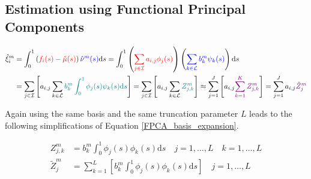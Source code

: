 \documentclass[11pt,twoside,a4paper]{article}
\begin{document}
	\subsection{Estimation using Functional Principal Components}
	
	
	\begin{equation}\label{FPCA_basis_expansion}
		\begin{split}
			\hat{\xi}_{i}^m & = \int_{0}^{1} \left({\color{red} f_i(s) - \hat{\mu}(s)}\right) {\color{blue}\hat{\nu}^m(s)} \mathrm{d}s
			= \int_{0}^{1} \left({\color{red}\sum_{j \in \mathcal{I}} a_{i,j} \phi_j(s)}\right) \left({\color{blue}\sum_{k \in \mathcal{L}} b_{k}^m \psi_{k}(s)}\right) \mathrm{d}s \\
			& = \sum_{j \in \mathcal{I}} \left[ a_{i,j}\sum_{k \in \mathcal{L}} {\color{teal}  b_{k}^m \int_{0}^{1} \phi_j(s) \psi_{k}(s)\mathrm{d}s}\right]
			= \sum_{j \in \mathcal{I}} \left[a_{i,j}\sum_{k \in \mathcal{L}} {\color{teal} Z_{j,k}^m} \right]
			\approx \sum_{j = 1}^{J} \left[a_{i,j}{\color{violet}\sum_{k = 1}^{K} Z_{j,k}^m} \right]
			= \sum_{j = 1}^{J} a_{i,j}{\color{violet}\tilde{Z}_{j}^m}
		\end{split}
	\end{equation}

	Again using the same basis and the same truncation parameter $L$ leads to the following simplifications of Equation \ref{FPCA_basis_expansion}.
	
	\begin{equation}
		\begin{split}
			Z_{j, k}^m & =  b_{k}^m \int_{0}^{1} \phi_j(s) \phi_k(s) \mathrm{d}s \quad j = 1, \dots, L \quad k = 1, \dots, L \\
			\tilde{Z}_{j}^m& = \sum_{k = 1}^{L} \left[ b_k^m \int_{0}^{1} \phi_j(s) \phi_k(s) \mathrm{d}s \right] \quad j = 1, \dots, L
		\end{split}
	\end{equation}
	
\end{document}
